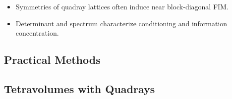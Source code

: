 \documentclass[
  10pt,
]{article}
\providecommand{\tightlist}{%
  \setlength{\itemsep}{0pt}\setlength{\parskip}{0pt}}
\begin{document}
\begin{itemize}
\tightlist
\item
  Symmetries of quadray lattices often induce near block-diagonal FIM.
\item
  Determinant and spectrum characterize conditioning and information
  concentration.
\end{itemize}

\hypertarget{practical-methods}{%
\subsection{Practical Methods}\label{practical-methods}}

\hypertarget{sec:tetravolumes_quadrays}{%
\subsection{Tetravolumes with
Quadrays}\label{sec:tetravolumes_quadrays}}
\end{document}
